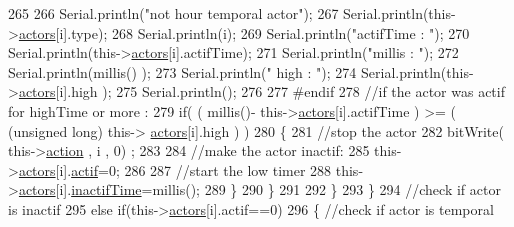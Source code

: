\begin{DoxyCode}
265                         
266                         Serial.println(\textcolor{stringliteral}{"not hour temporal actor"});
267                         Serial.println(this->\hyperlink{classJetpack_a7e16d2f97837f9712a2e6de1c50d99db}{actors}[i].type);
268                         Serial.println(i);
269                         Serial.println(\textcolor{stringliteral}{"actifTime : "});
270                         Serial.println(this->\hyperlink{classJetpack_a7e16d2f97837f9712a2e6de1c50d99db}{actors}[i].actifTime);
271                         Serial.println(\textcolor{stringliteral}{"millis : "});
272                         Serial.println(millis() );
273                         Serial.println(\textcolor{stringliteral}{" high : "});
274                         Serial.println(this->\hyperlink{classJetpack_a7e16d2f97837f9712a2e6de1c50d99db}{actors}[i].high );
275                         Serial.println();
276                     
277 \textcolor{preprocessor}{                    #endif}
278                         \textcolor{comment}{//if the actor was actif for highTime or more :}
279                         \textcolor{keywordflow}{if}( ( millis()- this->\hyperlink{classJetpack_a7e16d2f97837f9712a2e6de1c50d99db}{actors}[i].actifTime  ) >= ( (\textcolor{keywordtype}{unsigned} \textcolor{keywordtype}{long}) this->
      \hyperlink{classJetpack_a7e16d2f97837f9712a2e6de1c50d99db}{actors}[i].high  ) )
280                         \{
281                             \textcolor{comment}{//stop the actor}
282                             bitWrite( this->\hyperlink{classJetpack_aca3142925a7b0834b34ae91d26af7765}{action} , i , 0) ;
283 
284                             \textcolor{comment}{//make the actor inactif:}
285                             this->\hyperlink{classJetpack_a7e16d2f97837f9712a2e6de1c50d99db}{actors}[i].\hyperlink{structJetpack_1_1state_aa177541689bbaea21a4650a083b0df77}{actif}=0;
286 
287                             \textcolor{comment}{//start the low timer}
288                             this->\hyperlink{classJetpack_a7e16d2f97837f9712a2e6de1c50d99db}{actors}[i].\hyperlink{structJetpack_1_1state_aaf817b1f9e7a4d65b9e3ca4726b281f6}{inactifTime}=millis();              
289                         \}
290                     \}           
291                             
292                 \}
293             \}
294             \textcolor{comment}{//check if actor is inactif}
295             \textcolor{keywordflow}{else} \textcolor{keywordflow}{if}(this->\hyperlink{classJetpack_a7e16d2f97837f9712a2e6de1c50d99db}{actors}[i].actif==0)
296             \{   \textcolor{comment}{//check if actor is temporal}

\end{DoxyCode}
